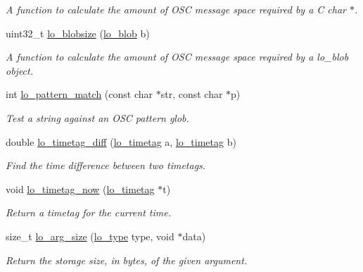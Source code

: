 \begin{DoxyCompactItemize}
\begin{DoxyCompactList}\small\item\em A function to calculate the amount of O\+S\+C message space required by a C char $\ast$. \end{DoxyCompactList}\item 
uint32\+\_\+t \hyperlink{group__liblolowlevel_ga2315f71c3832c365bce25d9b21726043}{lo\+\_\+blobsize} (\hyperlink{lo__types_8h_a8e780f8c09e3e4dd737fe249f11d16fc}{lo\+\_\+blob} b)
\begin{DoxyCompactList}\small\item\em A function to calculate the amount of O\+S\+C message space required by a lo\+\_\+blob object. \end{DoxyCompactList}\item 
int \hyperlink{group__liblolowlevel_gac26f3d15dbd23f34d4f9e4f6f0b81bbb}{lo\+\_\+pattern\+\_\+match} (const char $\ast$str, const char $\ast$p)
\begin{DoxyCompactList}\small\item\em Test a string against an O\+S\+C pattern glob. \end{DoxyCompactList}\item 
double \hyperlink{group__liblolowlevel_ga9937fce1bfce695b01cd3289ead8b919}{lo\+\_\+timetag\+\_\+diff} (\hyperlink{structlo__timetag}{lo\+\_\+timetag} a, \hyperlink{structlo__timetag}{lo\+\_\+timetag} b)
\begin{DoxyCompactList}\small\item\em Find the time difference between two timetags. \end{DoxyCompactList}\item 
void \hyperlink{group__liblolowlevel_gad687e21ed611e68748e962502ae63d8e}{lo\+\_\+timetag\+\_\+now} (\hyperlink{structlo__timetag}{lo\+\_\+timetag} $\ast$t)
\begin{DoxyCompactList}\small\item\em Return a timetag for the current time. \end{DoxyCompactList}\item 
size\+\_\+t \hyperlink{group__liblolowlevel_gaf793bbd32346a91d7d680d91ae68d1bd}{lo\+\_\+arg\+\_\+size} (\hyperlink{group__liblo_ga11838c576b0197c255ce805fd7434736}{lo\+\_\+type} type, void $\ast$data)
\begin{DoxyCompactList}\small\item\em Return the storage size, in bytes, of the given argument. \end{DoxyCompactList}\item 

\end{DoxyCompactItemize}

